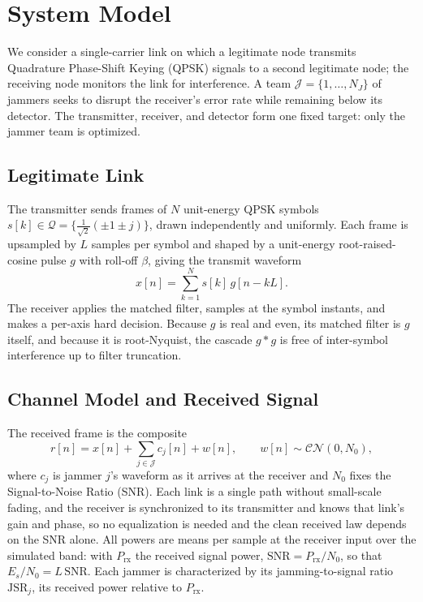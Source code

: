 \documentclass[conference]{IEEEtran}
\newcommand{\rar}[1]{{\color{blue}{[#1]}}}
\begin{document}
\section{System Model}
We consider a single-carrier link on which a legitimate node transmits Quadrature Phase-Shift Keying (QPSK) signals to a second legitimate node; the receiving node monitors the link for interference. 
A \rar{cooperative} team $\mathcal{J}=\{1,\ldots,N_J\}$ of jammers seeks to disrupt the receiver's error rate while remaining below its detector. 
The transmitter, receiver, and detector form one fixed target: only the jammer team is optimized.
\rar{Legitimate nodes currently take fixed TX/RX roles; generalizing to
symmetric transceivers -- each node both transmitting, receiving, and
detecting, as in the eventual multi-node network -- is planned future work.}
\rar{A co-adaptive/learning defender is future work; the fixed-defender
setting isolates the jammer-side learning problem first.}

\subsection{Legitimate Link}
The transmitter sends frames of $N$ unit-energy QPSK symbols $s[k]\in\mathcal{Q}= \{\tfrac{1}{\sqrt2}(\pm1\pm j)\}$, drawn independently and uniformly.
Each frame is upsampled by $L$ samples per symbol and shaped by a unit-energy root-raised-cosine pulse $g$ with roll-off $\beta$, giving the transmit waveform 
\begin{equation}
x[n]=\sum_{k=1}^{N} s[k]\,g[n-kL].
\label{eq:tx}
\end{equation}
The receiver applies the matched filter, samples at the symbol instants, and makes a per-axis hard decision.
Because $g$ is real and even, its matched filter is $g$ itself, and because it is root-Nyquist, the cascade $g*g$ is free of inter-symbol interference up to filter truncation.

\subsection{Channel Model and Received Signal}
\label{sec:channel}
The received frame is the composite
\begin{equation}
r[n]=x[n]+\sum_{j\in\mathcal{J}} c_j[n]+w[n],\qquad w[n]\sim\mathcal{CN}(0,N_0),
\label{eq:rx}
\end{equation}
where $c_j$ is jammer $j$'s waveform as it arrives at the receiver and $N_0$ fixes the Signal-to-Noise Ratio (SNR).
Each link is a single path without small-scale fading, and the receiver is synchronized to its transmitter and knows that link's gain and phase, so no equalization is needed and the clean received law depends on the SNR alone.
All powers are means per sample at the receiver input over the simulated band: with $P_{\mathrm{rx}}$ the received signal power, $\mathrm{SNR}=P_{\mathrm{rx}}/N_0$, so that $E_s/N_0=L\,\mathrm{SNR}$.
Each jammer is characterized by its jamming-to-signal ratio $\mathrm{JSR}_j$, its received power relative to $P_{\mathrm{rx}}$.
\end{document}
